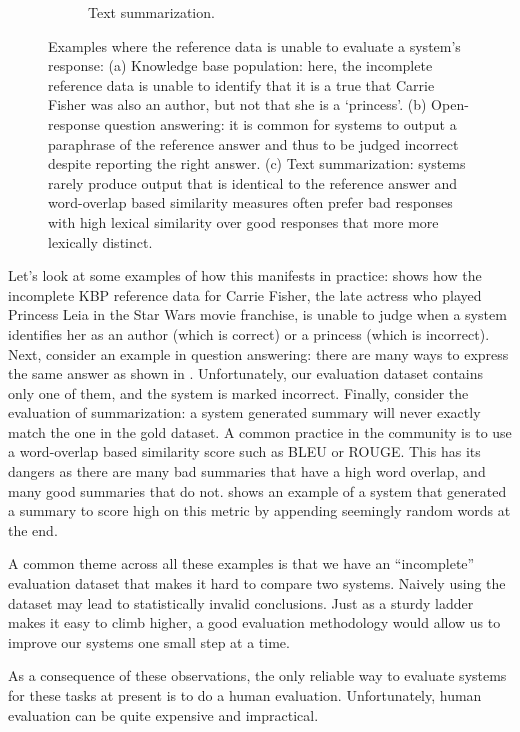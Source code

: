 \begin{figure}
\begin{subfigure}{0.65\textwidth}
    \caption{\label{fig:intro:example-summarization} Text summarization. }
  \end{subfigure}
  \caption{\label{fig:intro:examples} Examples where the reference   data is unable to evaluate a system's response:
  (a) Knowledge base population: here, the incomplete reference data is unable to identify that it is a true that Carrie Fisher was also an author, but not that she is a `princess'.
  (b) Open-response question answering: it is common for systems to output a paraphrase of the reference answer and thus to be judged incorrect despite reporting the right answer.
  (c) Text summarization: systems rarely produce output that is identical to the reference answer and word-overlap based similarity measures often prefer bad responses with high lexical similarity over good responses that more more lexically distinct.  
  }
\end{figure}

Let's look at some examples of how this manifests in practice:
 shows how the incomplete KBP reference data for Carrie Fisher, the late actress who played Princess Leia in the Star Wars movie franchise, is unable to judge when a system identifies her as an author (which is correct) or a princess (which is incorrect).
Next, consider an example in question answering: there are many ways to express the same answer as shown in . Unfortunately, our evaluation dataset contains only one of them, and the system is marked incorrect.
Finally, consider the evaluation of summarization: a system generated summary will never exactly match the one in the gold dataset.
A common practice in the community is to use a word-overlap based similarity score such as BLEU or ROUGE\@.
This has its dangers as there are many bad summaries that have a high word overlap, and many good summaries that do not.  shows an example of a system that generated a summary to score high on this metric by appending seemingly random words at the end.

A common theme across all these examples is that we have an ``incomplete'' evaluation dataset that makes it hard to compare two systems.
Naively using the dataset may lead to statistically invalid conclusions.
Just as a sturdy ladder makes it easy to climb higher, a good evaluation methodology would allow us to improve our systems one small step at a time.

As a consequence of these observations, the only reliable way to evaluate systems for these tasks at present is to do a human evaluation.
Unfortunately, human evaluation can be quite expensive and impractical.

